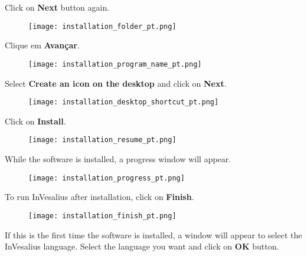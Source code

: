 \hspace{.2cm}

Click on \textbf{Next} button again. 

\begin{figure}[!htb]  
\centering
\texttt{[image: installation\_folder\_pt.png]}
\end{figure}

\newpage

Clique em \textbf{Avançar}.
\begin{figure}[!htb]
\centering
\texttt{[image: installation\_program\_name\_pt.png]}
\end{figure}

\hspace{.2cm}

Select \textbf{Create an icon on the desktop} and click on \textbf{Next}.

\begin{figure}[!htb]
\centering
\texttt{[image: installation\_desktop\_shortcut\_pt.png]}
\end{figure}

\newpage

Click on \textbf{Install}.

\begin{figure}[!htb]
\centering
\texttt{[image: installation\_resume\_pt.png]}
\end{figure}

\hspace{.2cm}


While the software is installed, a progress window will appear.

\begin{figure}[!htb]
\centering
\texttt{[image: installation\_progress\_pt.png]}
\end{figure}

\newpage

To run InVesalius after installation, click on \textbf{Finish}.

\begin{figure}[!htb]
\centering
\texttt{[image: installation\_finish\_pt.png]}
\end{figure}

\hspace{.2cm}

If this is the first time the software is installed, a window will appear to select the InVesalius language. Select the language you want and click on \textbf{OK} button.

